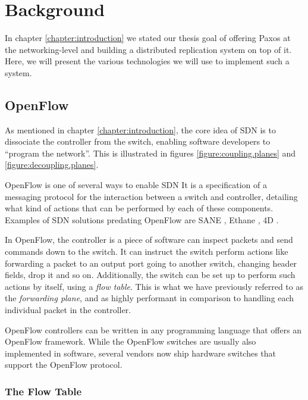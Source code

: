 \chapter{Background}
\label{chapter:background}

In chapter \ref{chapter:introduction} we stated our thesis goal of offering
Paxos at the networking-level and building a distributed replication system
on top of it.
%
Here, we will present the various technologies we will use to implement such
a system.

\section{OpenFlow}
\label{chapter:openflow.background}

As mentioned in chapter \ref{chapter:introduction}, the core idea of
\acs{SDN} is to dissociate the controller from the switch, enabling software
developers to ``program the network''.  This is illustrated in figures
\ref{figure:coupling.planes} and \vref{figure:decoupling.planes}.

OpenFlow \cite{McKeown:2008:OEI:1355734.1355746,openflow-1.0} is one of
several ways to enable \acf{SDN}
%
It is a specification of a messaging protocol for the interaction between
a switch and controller, detailing what kind of actions that can be
performed by each of these components.
%
Examples of \ac{SDN} solutions predating OpenFlow are SANE
\cite{Casado:2006:SPA:1267336.1267346}, Ethane
\cite{Casado:2007:ETC:1282427.1282382}, 4D
\cite{Greenberg:2005:CSA:1096536.1096541}.

In OpenFlow, the controller is a piece of software can inspect packets and
send commands down to the switch.  It can instruct the switch perform actions like
forwarding a packet to an output port going to another switch, changing
header fields, drop it and so on.
%
Additionally, the switch can be set up to perform such actions by itself,
using a \textit{flow table}.  This is what we have previously referred to as
the \textit{forwarding plane}, and as highly performant in comparison to
handling each individual packet in the controller.

OpenFlow controllers can be written in any programming language that offers
an OpenFlow framework.  While the OpenFlow switches are usually also
implemented in software, several vendors now ship hardware switches that
support the OpenFlow protocol.

\subsection{The Flow Table}
\label{chapter:theory.flow.table}

